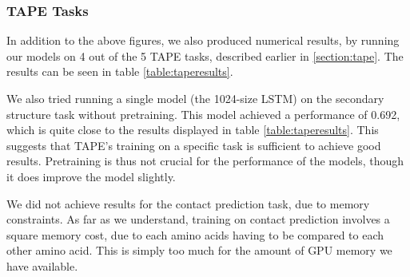 \documentclass[a4paper,12pt]{article}
\begin{document}


\subsubsection{TAPE Tasks}
\label{section:TAPE_results}
In addition to the above figures, we also produced numerical results, by running our models on 4 out of the 5 TAPE tasks, described earlier in \ref{section:tape}. The results can be seen in table \ref{table:taperesults}.

We also tried running a single model (the 1024-size LSTM) on the secondary structure task without pretraining. This model achieved a performance of 0.692, which is quite close to the results displayed in table \ref{table:taperesults}. This suggests that TAPE's training on a specific task is sufficient to achieve good results. Pretraining is thus not crucial for the performance of the models, though it does improve the model slightly.

We did not achieve results for the contact prediction task, due to memory constraints. As far as we understand, training on contact prediction involves a square memory cost, due to each amino acids having to be compared to each other amino acid. This is simply too much for the amount of GPU memory we have available.
\end{document}
